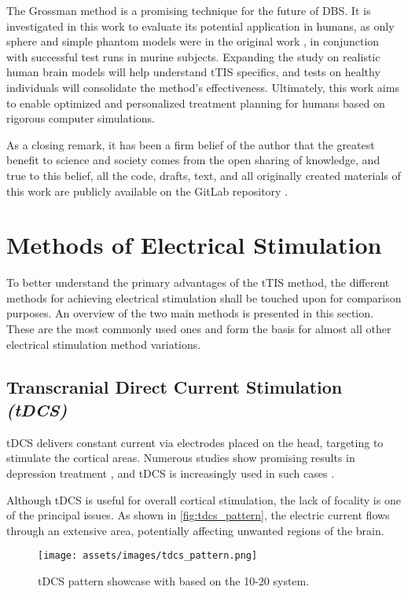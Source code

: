 The Grossman method is a promising technique for the future of \gls{DBS}. It is investigated in this work to evaluate its potential application in humans, as only sphere and simple phantom models were in the original work \cite{Grossman2017}, in conjunction with successful test runs in murine subjects. Expanding the study on realistic human brain models will help understand \gls{tTIS} specifics, and tests on healthy individuals will consolidate the method's effectiveness. Ultimately, this work aims to enable optimized and personalized treatment planning for humans based on rigorous computer simulations.

As a closing remark, it has been a firm belief of the author that the greatest benefit to science and society comes from the open sharing of knowledge, and true to this belief, all the code, drafts, text, and all originally created materials of this work are publicly available on the GitLab repository \cite{thesis_repo}.

\section{Methods of Electrical Stimulation}

To better understand the primary advantages of the \gls{tTIS} method, the different methods for achieving electrical stimulation shall be touched upon for comparison purposes. An overview of the two main methods is presented in this section. These are the most commonly used ones and form the basis for almost all other electrical stimulation method variations.

\subsection{Transcranial Direct Current Stimulation \textit{(tDCS)}}

\gls{tDCS} delivers constant current via electrodes placed on the head, targeting to stimulate the cortical areas. Numerous studies show promising results in depression treatment \cite{Moffa2020,Brunoni2016}, and \gls{tDCS} is increasingly used in such cases \cite{Nitsche2008}.

Although \gls{tDCS} is useful for overall cortical stimulation, the lack of focality is one of the principal issues. As shown in \autoref{fig:tdcs_pattern}, the electric current flows through an extensive area, potentially affecting unwanted regions of the brain.

\begin{figure}[H]
    \centering
    \texttt{[image: assets/images/tdcs\_pattern.png]}
    \caption{\gls{tDCS} pattern showcase with  based on the 10-20 system.}
    \label{fig:tdcs_pattern}
\end{figure}

